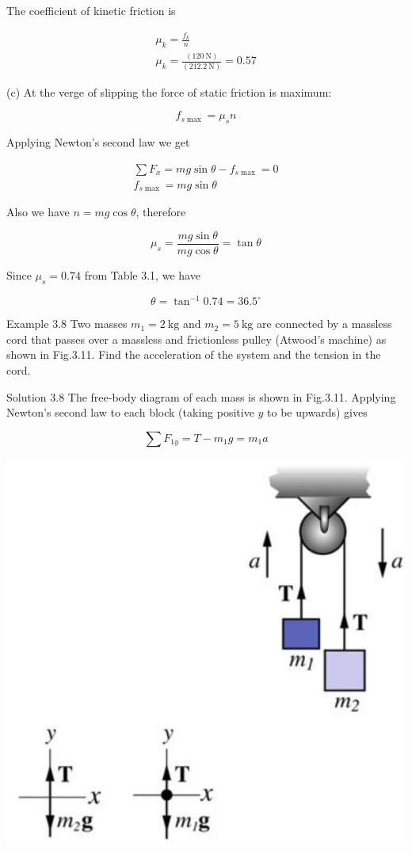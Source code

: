 \documentclass[10pt]{article}
\begin{document}
The coefficient of kinetic friction is

$$
\begin{gathered}
\mu_{k}=\frac{f_{k}}{n} \\
\mu_{k}=\frac{(120 \mathrm{~N})}{(212.2 \mathrm{~N})}=0.57
\end{gathered}
$$

(c) At the verge of slipping the force of static friction is maximum:

$$
f_{s \max }=\mu_{s} n
$$

Applying Newton's second law we get

$$
\begin{gathered}
\sum F_{x}=m g \sin \theta-f_{s \max }=0 \\
f_{s \max }=m g \sin \theta
\end{gathered}
$$

Also we have $n=m g \cos \theta$, therefore

$$
\mu_{s}=\frac{m g \sin \theta}{m g \cos \theta}=\tan \theta
$$

Since $\mu_{s}=0.74$ from Table 3.1, we have

$$
\theta=\tan ^{-1} 0.74=36.5^{\circ}
$$

Example 3.8 Two masses $m_{1}=2 \mathrm{~kg}$ and $m_{2}=5 \mathrm{~kg}$ are connected by a massless cord that passes over a massless and frictionless pulley (Atwood's machine) as shown in Fig.3.11. Find the acceleration of the system and the tension in the cord.

Solution 3.8 The free-body diagram of each mass is shown in Fig.3.11. Applying Newton's second law to each block (taking positive $y$ to be upwards) gives

$$
\sum F_{1 y}=T-m_{1} g=m_{1} a
$$

\begin{center}
\includegraphics[max width=\textwidth]{2024_09_13_db1f357d2aad0a03eb2eg-055}
\end{center}
\end{document}
